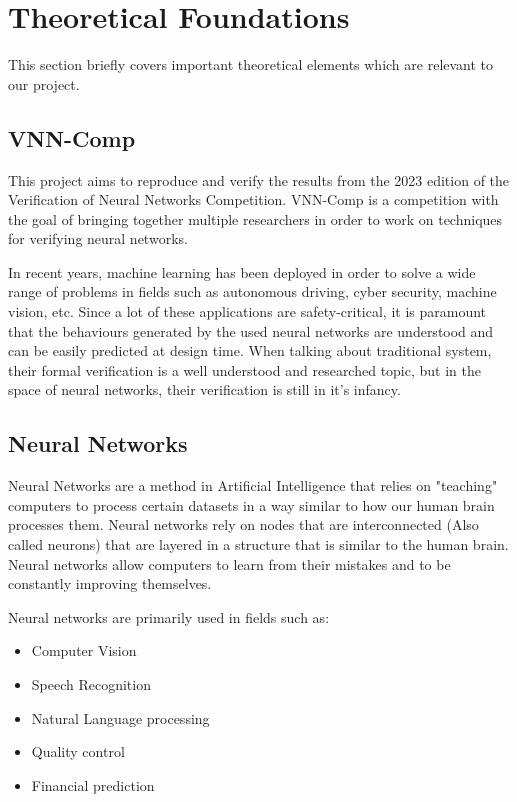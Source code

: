 \documentclass[12pt]{report}
\begin{document}
\section{Theoretical Foundations}
This section briefly covers important theoretical elements which are relevant to our project.
\subsection{VNN-Comp}
This project aims to reproduce and verify the results from the 2023 edition of the Verification of Neural Networks Competition.
VNN-Comp is a competition with the goal of bringing together multiple researchers in order to work on techniques for verifying neural networks.

In recent years, machine learning has been deployed in order to solve a wide range of problems in fields such as autonomous driving, cyber security, machine vision, etc.
Since a lot of these applications are safety-critical, it is paramount that the behaviours generated by the used neural networks are understood and can be easily predicted at design time.
When talking about traditional system, their formal verification is a well understood and researched topic, but in the space of neural networks, their verification is still in it's infancy. \cite{vnncomp-2023}

\subsection{Neural Networks}
Neural Networks are a method in Artificial Intelligence that relies on "teaching" computers to process certain datasets in a way similar to how our human brain processes them.
Neural networks rely on nodes that are interconnected (Also called neurons)  that are layered in a structure that is similar to the human brain. 
Neural networks allow computers to learn from their mistakes and to be constantly improving themselves. 

Neural networks are primarily used in fields such as:
\begin{itemize}
    \item Computer Vision
    \item Speech Recognition
    \item Natural Language processing
    \item Quality control
    \item Financial prediction
\end{itemize}
\end{document}

